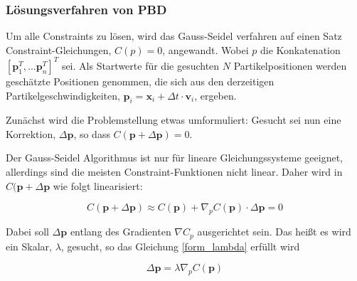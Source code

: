 
\subsubsection{Lösungsverfahren von PBD}

Um alle Constraints zu lösen, wird das Gauss-Seidel verfahren auf einen Satz Constraint-Gleichungen, $C(p)=0$, angewandt. Wobei $p$ die Konkatenation $[\textbf{p}_1^T,...\textbf{p}_n^T]^T$ sei.
Als Startwerte für die gesuchten $N$ Partikelpositionen werden geschätzte Positionen genommen, die sich aus den derzeitigen Partikelgeschwindigkeiten, $\textbf{p}_i = \textbf{x}_i + \Delta t \cdot \textbf{v}_i$, ergeben. 

Zunächst wird die Problemstellung etwas umformuliert: Gesucht sei nun eine Korrektion, $\Delta \textbf{p}$, so dass $C(\textbf{p}+\Delta \textbf{p})=0$. 

Der Gauss-Seidel Algorithmus ist nur für lineare Gleichungssysteme geeignet, allerdings sind die meisten Constraint-Funktionen nicht linear. Daher wird in \cite{PBD} $C(\textbf{p}+\Delta \textbf{p}$ wie folgt linearisiert:

\begin{equation}
C(\textbf{p}+\Delta \textbf{p}) \approx C(\textbf{p}) + \nabla_p C(\textbf{p}) \cdot \Delta \textbf{p} = 0
\label{form_C}
\end{equation}

Dabei soll $\Delta \textbf{p}$ entlang des Gradienten $\nabla C_p$ ausgerichtet sein. Das heißt es wird ein Skalar, $\lambda$, gesucht, so das Gleichung \ref{form_lambda} erfüllt wird \cite{PBD}

\begin{equation}
\Delta \textbf{p} = \lambda \nabla_p C(\textbf{p})
\label{form_lambda}
\end{equation}

